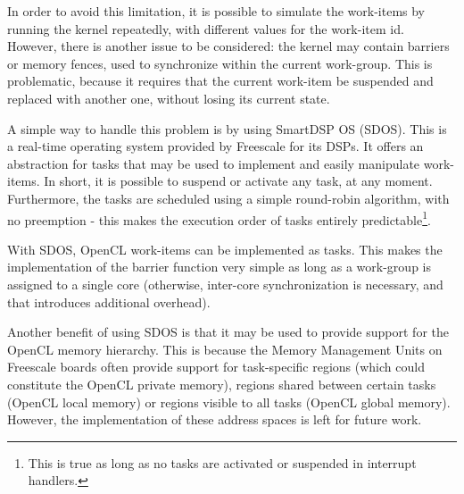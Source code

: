 In order to avoid this limitation, it is possible to simulate the work-items by running the kernel repeatedly, with different values for the work-item id. However, there is another issue to be considered: the kernel may contain barriers or memory fences, used to synchronize within the current work-group. This is problematic, because it requires that the current work-item be suspended and replaced with another one, without losing its current state.

A simple way to handle this problem is by using SmartDSP OS (SDOS)\cite{sdos}. This is a real-time operating system provided by Freescale for its DSPs. It offers an abstraction for tasks that may be used to implement and easily manipulate work-items. In short, it is possible to suspend or activate any task, at any moment. Furthermore, the tasks are scheduled using a simple round-robin algorithm, with no preemption - this makes the execution order of tasks entirely predictable\footnote{This is true as long as no tasks are activated or suspended in interrupt handlers.}. 

With SDOS, OpenCL work-items can be implemented as tasks. This makes the implementation of the barrier function very simple as long as a work-group is assigned to a single core (otherwise, inter-core synchronization is necessary, and that introduces additional overhead).

Another benefit of using SDOS is that it may be used to provide support for the OpenCL memory hierarchy. This is because the Memory Management Units on Freescale boards often provide support for task-specific regions (which could constitute the OpenCL private memory), regions shared between certain tasks (OpenCL local memory) or regions visible to all tasks (OpenCL global memory). However, the implementation of these address spaces is left for future work.


